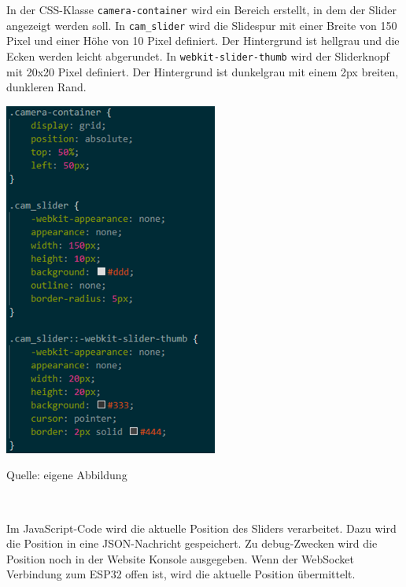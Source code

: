 \documentclass[ngerman,12pt,a4paper]{article}
\begin{document}
	In der CSS-Klasse \texttt{camera-container} wird ein Bereich erstellt, in dem der Slider angezeigt werden soll.  In \texttt{cam\_slider} wird die Slidespur mit einer Breite von 150 Pixel und einer Höhe von 10 Pixel definiert. Der Hintergrund ist hellgrau und die Ecken werden leicht abgerundet.  In \texttt{webkit-slider-thumb} wird der Sliderknopf mit 20x20 Pixel definiert. Der Hintergrund ist dunkelgrau mit einem 2px breiten, dunkleren Rand. \\
	\begin{center}
		\begin{minipage}[t]{0.5\textwidth}
			\includegraphics{Pictures/kamera-css}
			\label{fig:kamera-css}
			\vspace{-10pt}
			\begin{center}
				\par\small Quelle: eigene Abbildung 
			\end{center}
		\end{minipage} \\[2cm]
	\end{center}
	Im JavaScript-Code wird die aktuelle Position des Sliders verarbeitet. Dazu wird die Position in eine JSON-Nachricht gespeichert. Zu debug-Zwecken wird die Position noch in der Website Konsole ausgegeben. Wenn der WebSocket Verbindung zum ESP32 offen ist, wird die aktuelle Position übermittelt. \\
\end{document}
